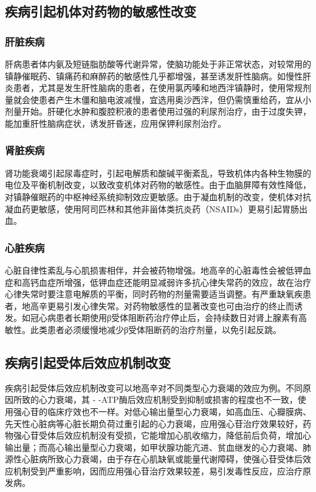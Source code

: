 \subsection{疾病引起机体对药物的敏感性改变}

\subsubsection{肝脏疾病}

肝病患者体内氨及短链脂肪酸等代谢异常，使脑功能处于非正常状态，对较常用的镇静催眠药、镇痛药和麻醉药的敏感性几乎都增强，甚至诱发肝性脑病。如慢性肝炎患者，尤其是发生肝性脑病的患者，在使用氯丙嗪和地西泮镇静时，使用常规剂量就会使患者产生木僵和脑电波减慢，宜选用奥沙西泮，但仍需慎重给药，宜从小剂量开始。肝硬化水肿和腹腔积液的患者使用过强的利尿剂治疗，由于过度失钾，能加重肝性脑病症状，诱发肝昏迷，应用保钾利尿剂治疗。

\subsubsection{肾脏疾病}

肾功能衰竭引起尿毒症时，引起电解质和酸碱平衡紊乱，导致机体内各种生物膜的电位及平衡机制改变，以致改变机体对药物的敏感性。由于血脑屏障有效性降低，对镇静催眠药的中枢神经系统抑制效应更敏感。由于凝血机制的改变，使机体对抗凝血药更敏感，使用阿司匹林和其他非甾体类抗炎药（NSAIDs）更易引起胃肠出血。

\subsubsection{心脏疾病}

心脏自律性紊乱与心肌损害相伴，并会被药物增强。地高辛的心脏毒性会被低钾血症和高钙血症所增强，低钾血症还能明显减弱许多抗心律失常药的效应，故在治疗心律失常时要注意电解质的平衡，同时药物的剂量需要适当调整。有严重缺氧疾患者，地高辛更易引发心律失常。对药物敏感性的显著改变也可由治疗的终止而诱发。如冠心病患者长期使用β受体阻断药治疗停止后，会持续数日对肾上腺素有高敏性。此类患者必须缓慢地减少β受体阻断药的治疗剂量，以免引起反跳。

\subsection{疾病引起受体后效应机制改变}

疾病引起受体后效应机制改变可以地高辛对不同类型心力衰竭的效应为例。不同原因所致的心力衰竭，其
-
-ATP酶后效应机制受到抑制或损害的程度也不一致，使用强心苷的临床疗效也不一样。对低心输出量型心力衰竭，如高血压、心瓣膜病、先天性心脏病等心脏长期负荷过重引起的心力衰竭，应用强心苷治疗效果较好，药物强心苷受体后效应机制没有受损，它能增加心肌收缩力，降低前后负荷，增加心输出量；而高心输出量型心力衰竭，如甲状腺功能亢进、贫血继发的心力衰竭、肺源性心脏病所致心力衰竭，由于存在心肌缺氧或能量代谢障碍，使强心苷受体后效应机制受到严重影响，因而应用强心苷治疗效果较差，易引发毒性反应，应治疗原发病。

